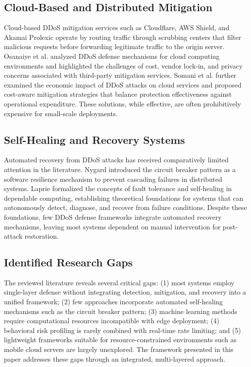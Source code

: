 \documentclass[conference]{IEEEtran}
\begin{document}
\subsection{Cloud-Based and Distributed Mitigation}

Cloud-based DDoS mitigation services such as Cloudflare, AWS Shield, and Akamai Prolexic operate by routing traffic through scrubbing centers that filter malicious requests before forwarding legitimate traffic to the origin server. Osanaiye et al. \cite{b3} analyzed DDoS defense mechanisms for cloud computing environments and highlighted the challenges of cost, vendor lock-in, and privacy concerns associated with third-party mitigation services. Somani et al. \cite{b16} further examined the economic impact of DDoS attacks on cloud services and proposed cost-aware mitigation strategies that balance protection effectiveness against operational expenditure. These solutions, while effective, are often prohibitively expensive for small-scale deployments.

\subsection{Self-Healing and Recovery Systems}

Automated recovery from DDoS attacks has received comparatively limited attention in the literature. Nygard \cite{b9} introduced the circuit breaker pattern as a software resilience mechanism to prevent cascading failures in distributed systems. Laprie \cite{b17} formalized the concepts of fault tolerance and self-healing in dependable computing, establishing theoretical foundations for systems that can autonomously detect, diagnose, and recover from failure conditions. Despite these foundations, few DDoS defense frameworks integrate automated recovery mechanisms, leaving most systems dependent on manual intervention for post-attack restoration.

\subsection{Identified Research Gaps}

The reviewed literature reveals several critical gaps: (1) most systems employ single-layer defense without integrating detection, mitigation, and recovery into a unified framework; (2) few approaches incorporate automated self-healing mechanisms such as the circuit breaker pattern; (3) machine learning methods require computational resources incompatible with edge deployment; (4) behavioral risk profiling is rarely combined with real-time rate limiting; and (5) lightweight frameworks suitable for resource-constrained environments such as mobile cloud servers are largely unexplored. The framework presented in this paper addresses these gaps through an integrated, multi-layered approach.
\end{document}
